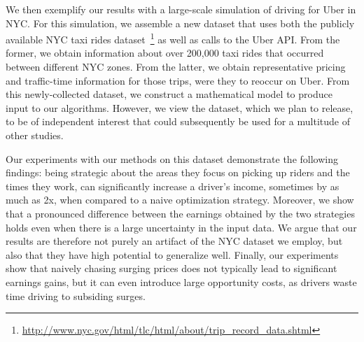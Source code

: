 We then exemplify our  results with a large-scale simulation of driving for Uber in NYC. 
For this simulation, we assemble a new dataset that uses both the publicly available NYC taxi rides 
dataset~\footnote{\url{http://www.nyc.gov/html/tlc/html/about/trip_record_data.shtml}} as well as calls to the Uber API.
From the former, we obtain information about over 200,000 taxi rides that occurred between different NYC zones. 
From the latter, we obtain representative pricing and traffic-time information for those trips, were they to reoccur on Uber.
From this newly-collected dataset, we construct a mathematical model to produce input to our algorithms. 
However, we view the dataset, which we plan to release, to be of independent interest that could subsequently 
be used for a multitude of other studies.

Our experiments with our methods on this dataset demonstrate the following findings:
being strategic about the areas they focus on picking up riders and the times they work, 
can significantly increase a driver's income, sometimes by
as much as 2x, when compared to a naive optimization strategy.
Moreover, we show that a pronounced difference between the earnings obtained by the 
two strategies holds even when there is a large uncertainty in the input data. 
We argue that our results are therefore not purely an artifact of the NYC dataset we employ, 
  but also that they have high potential to generalize well.
Finally, our experiments show that naively chasing surging prices does not typically lead 
  to significant earnings gains, but it can even introduce large opportunity costs, as drivers
  waste time driving to subsiding surges. 
